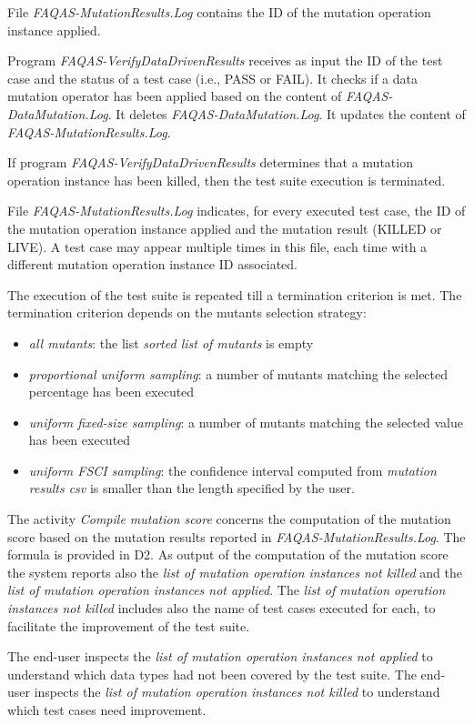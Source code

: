 File \emph{FAQAS-MutationResults.Log} contains the ID of the mutation operation instance applied.

Program \emph{FAQAS-VerifyDataDrivenResults} receives as input the ID of the test case and  the status of a test case (i.e., PASS or FAIL). It checks if a data mutation operator has been applied based on the content of \emph{FAQAS-DataMutation.Log}. It deletes \emph{FAQAS-DataMutation.Log}. It updates the content of \emph{FAQAS-MutationResults.Log}.

If program \emph{FAQAS-VerifyDataDrivenResults} determines that a mutation operation instance has been killed, then the test suite execution is terminated.

File \emph{FAQAS-MutationResults.Log} indicates, for every executed test case, the ID of the mutation operation instance applied and the mutation result (KILLED or LIVE). A test case may appear multiple times in this file, each time with a different mutation operation instance ID associated.

The execution of the test suite is repeated till a termination criterion is met. The termination criterion depends on the mutants selection strategy:
\begin{itemize}
\item \emph{all mutants}: the list \emph{sorted list of mutants} is empty
\item \emph{proportional uniform sampling}: a number of mutants matching the selected percentage has been executed
\item \emph{uniform fixed-size sampling}: a number of mutants matching the selected value has been executed
\item \emph{uniform FSCI sampling}: the confidence interval computed from \emph{mutation results csv} is smaller than the length specified by the user.
\end{itemize}

The activity \emph{Compile mutation score} concerns the computation of the mutation score based on the mutation results reported in \emph{FAQAS-MutationResults.Log}. The formula is provided in D2. As output of the computation of the mutation score the system reports also the \emph{list of mutation operation instances not killed} and the \emph{list of mutation operation instances not applied}. The \emph{list of mutation operation instances not killed} includes also the name of test cases executed for each, to facilitate the improvement of the test suite.

The end-user inspects the \emph{list of mutation operation instances not applied} to understand which data types had not been covered by the test suite. The end-user inspects the \emph{list of mutation operation instances not killed} to understand which test cases need improvement.




